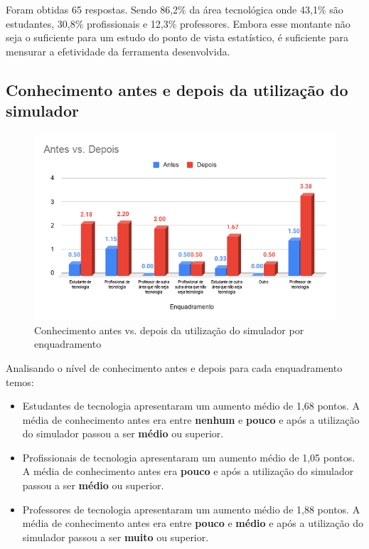 Foram obtidas 65 respostas. Sendo 86,2\% da área tecnológica onde 43,1\% são estudantes, 30,8\% profissionais e 12,3\% professores. Embora esse montante não seja o suficiente para um estudo do ponto de vista estatístico, é suficiente para mensurar a efetividade da ferramenta desenvolvida.

\subsection{Conhecimento antes e depois da utilização do simulador}

\begin{figure}[H]
    \centering
    \caption{Conhecimento antes vs. depois da utilização do simulador por enquadramento}
    \includegraphics[width=.9\linewidth]{Questionario/CQ2Q3.png}
\end{figure}

Analisando o nível de conhecimento antes e depois para cada enquadramento temos:

\begin{itemize}
    \item Estudantes de tecnologia apresentaram um aumento médio de 1,68 pontos. A média de conhecimento antes era entre \textbf{nenhum} e \textbf{pouco} e após a utilização do simulador passou a ser \textbf{médio} ou superior.
    \item Profissionais de tecnologia apresentaram um aumento médio de 1,05 pontos. A média de conhecimento antes era \textbf{pouco} e após a utilização do simulador passou a ser \textbf{médio} ou superior.
    \item Professores de tecnologia apresentaram um aumento médio de 1,88 pontos. A média de conhecimento antes era entre \textbf{pouco} e \textbf{médio} e após a utilização do simulador passou a ser \textbf{muito} ou superior.
\end{itemize}

